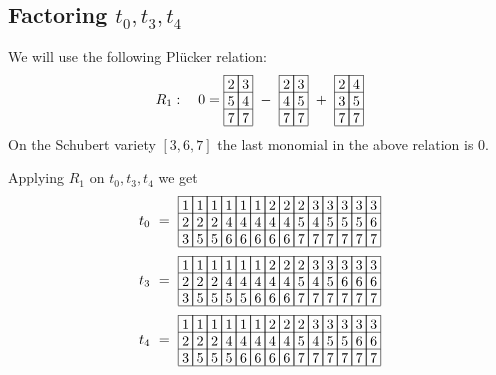 \subsection{Factoring \(t_0,t_3,t_4\)}
We will use the  following Pl\"{u}cker relation:
\begin{align*}
R_1 :\ \ \ 0 = 
\begin{array}[c]{*{2}c}\cline{1-2}
\lr{2}&\lr{3}\\\cline{1-2}
\lr{5}&\lr{4}\\\cline{1-2}
\lr{7}&\lr{7}\\\cline{1-2}
\end{array}
\ -\ 
\begin{array}[c]{*{2}c}\cline{1-2}
\lr{2}&\lr{3}\\\cline{1-2}
\lr{4}&\lr{5}\\\cline{1-2}
\lr{7}&\lr{7}\\\cline{1-2}
\end{array}
\ +\ 
\begin{array}[c]{*{2}c}\cline{1-2}
\lr{2}&\lr{4}\\\cline{1-2}
\lr{3}&\lr{5}\\\cline{1-2}
\lr{7}&\lr{7}\\\cline{1-2}
\end{array}
\end{align*}
On  the Schubert variety \([3,6,7]\) the last monomial in the above relation is \(0\).

Applying \(R_1\) on \(t_0,t_3,t_4\)  we get
\[
    t_0\ =\ 
\begin{array}[c]{*{14}c}\cline{1-14}
\lr{1}&\lr{1}&\lr{1}&\lr{1}&\lr{1}&\lr{1}&\lr{2}&\lr{2}&\lr{2}&\lr{3}&\lr{3}&\lr{3}&\lr{3}&\lr{3}\\\cline{1-14}
\lr{2}&\lr{2}&\lr{2}&\lr{4}&\lr{4}&\lr{4}&\lr{4}&\lr{4}&\lr{5}&\lr{4}&\lr{5}&\lr{5}&\lr{5}&\lr{6}\\\cline{1-14}
\lr{3}&\lr{5}&\lr{5}&\lr{6}&\lr{6}&\lr{6}&\lr{6}&\lr{6}&\lr{7}&\lr{7}&\lr{7}&\lr{7}&\lr{7}&\lr{7}\\\cline{1-14}
\end{array}
\]
\[   
t_3\ =\ 
\begin{array}[c]{*{14}c}\cline{1-14}
\lr{1}&\lr{1}&\lr{1}&\lr{1}&\lr{1}&\lr{1}&\lr{2}&\lr{2}&\lr{2}&\lr{3}&\lr{3}&\lr{3}&\lr{3}&\lr{3}\\\cline{1-14}
\lr{2}&\lr{2}&\lr{2}&\lr{4}&\lr{4}&\lr{4}&\lr{4}&\lr{4}&\lr{5}&\lr{4}&\lr{5}&\lr{6}&\lr{6}&\lr{6}\\\cline{1-14}
\lr{3}&\lr{5}&\lr{5}&\lr{5}&\lr{5}&\lr{6}&\lr{6}&\lr{6}&\lr{7}&\lr{7}&\lr{7}&\lr{7}&\lr{7}&\lr{7}\\\cline{1-14}
\end{array}
\]
\[
t_4\ =\ 
\begin{array}[c]{*{14}c}\cline{1-14}
\lr{1}&\lr{1}&\lr{1}&\lr{1}&\lr{1}&\lr{1}&\lr{2}&\lr{2}&\lr{2}&\lr{3}&\lr{3}&\lr{3}&\lr{3}&\lr{3}\\\cline{1-14}
\lr{2}&\lr{2}&\lr{2}&\lr{4}&\lr{4}&\lr{4}&\lr{4}&\lr{4}&\lr{5}&\lr{4}&\lr{5}&\lr{5}&\lr{6}&\lr{6}\\\cline{1-14}
\lr{3}&\lr{5}&\lr{5}&\lr{5}&\lr{6}&\lr{6}&\lr{6}&\lr{6}&\lr{7}&\lr{7}&\lr{7}&\lr{7}&\lr{7}&\lr{7}\\\cline{1-14}
\end{array}
\]

